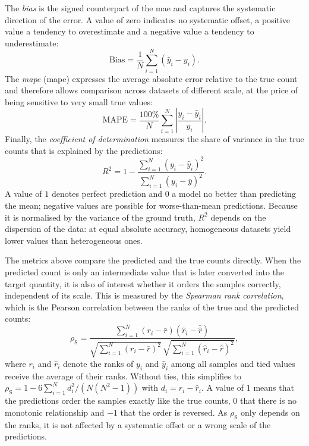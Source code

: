 \documentclass[12pt,parskip = half, DIV=classic,listof=totoc]{scrartcl}
\begin{document}
				The \emph{bias} is the signed counterpart of the \ac{mae} and captures the
				systematic direction of the error. A value of zero indicates no systematic
				offset, a positive value a tendency to overestimate and a negative value a
				tendency to underestimate:
				\begin{equation}
					\mathrm{Bias} = \frac{1}{N}\sum_{i=1}^{N}(\hat{y}_i - y_i) .
				\end{equation}
				The \emph{\acl{mape}} (\acs*{mape}) expresses the average absolute error
				relative to the true count and therefore allows comparison across datasets of
				different scale, at the price of being sensitive to very small true values:
				\begin{equation}
					\mathrm{MAPE} = \frac{100\%}{N}\sum_{i=1}^{N}\left\lvert\frac{y_i - \hat{y}_i}{y_i}\right\rvert .
				\end{equation}
				Finally, the \emph{coefficient of determination} measures the share of variance
				in the true counts that is explained by the predictions:
				\begin{equation}
					R^2 = 1 - \frac{\sum_{i=1}^{N}(y_i - \hat{y}_i)^2}{\sum_{i=1}^{N}(y_i - \bar{y})^2} .
				\end{equation}
				A value of $1$ denotes perfect prediction and $0$ a model no better than
				predicting the mean; negative values are possible for worse-than-mean
				predictions. Because it is normalised by the variance of the ground truth,
				$R^2$ depends on the dispersion of the data: at equal absolute accuracy,
				homogeneous datasets yield lower values than heterogeneous ones.

				The metrics above compare the predicted and the true counts directly. When the predicted count 
				is only an intermediate value that is later converted into the target quantity, it is also of 
				interest whether it orders the samples correctly, independent of its scale. This is measured by 
				the \emph{Spearman rank correlation}, which is the 
				Pearson correlation between the ranks of the true and the predicted counts:
				\begin{equation}
					\rho_{\text{S}} = \frac{\sum_{i=1}^{N}(r_i - \bar{r})(\hat{r}_i - \bar{\hat{r}})}
					{\sqrt{\sum_{i=1}^{N}(r_i - \bar{r})^2}\,\sqrt{\sum_{i=1}^{N}(\hat{r}_i - \bar{\hat{r}})^2}} ,
				\end{equation}
				where $r_i$ and $\hat{r}_i$ denote the ranks of $y_i$ and $\hat{y}_i$ among all samples and tied 
				values receive the average of their ranks. Without ties, this simplifies to 
				$\rho_{\text{S}} = 1 - 6\sum_{i=1}^{N} d_i^2 / \left(N(N^2-1)\right)$ with $d_i = r_i - \hat{r}_i$. 
				A value of $1$ means that the predictions order the samples exactly like the true counts, $0$ that 
				there is no monotonic relationship and $-1$ that the order is reversed. As $\rho_{\text{S}}$ only 
				depends on the ranks, it is not affected by a systematic offset or a wrong scale of the predictions.
\end{document}

